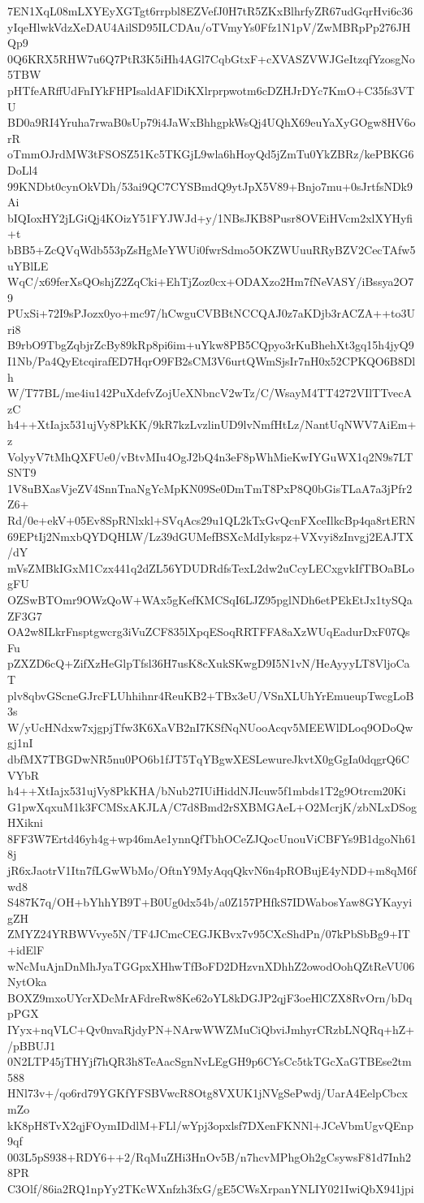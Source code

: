 7EN1XqL08mLXYEyXGTgt6rrpbl8EZVefJ0H7tR5ZKxBlhrfyZR67udGqrHvi6c36
yIqeHlwkVdzXeDAU4AilSD95ILCDAu/oTVmyYs0Ffz1N1pV/ZwMBRpPp276JHQp9
0Q6KRX5RHW7u6Q7PtR3K5iHh4AGl7CqbGtxF+cXVASZVWJGeItzqfYzosgNo5TBW
pHTfeARffUdFnIYkFHPIsaldAFlDiKXlrprpwotm6cDZHJrDYc7KmO+C35fs3VTU
BD0a9RI4Yruha7rwaB0sUp79i4JaWxBhhgpkWsQj4UQhX69euYaXyGOgw8HV6orR
oTmmOJrdMW3tFSOSZ51Kc5TKGjL9wla6hHoyQd5jZmTu0YkZBRz/kePBKG6DoLl4
99KNDbt0cynOkVDh/53ai9QC7CYSBmdQ9ytJpX5V89+Bnjo7mu+0sJrtfsNDk9Ai
bIQIoxHY2jLGiQj4KOizY51FYJWJd+y/1NBsJKB8Pusr8OVEiHVcm2xlXYHyfi+t
bBB5+ZcQVqWdb553pZsHgMeYWUi0fwrSdmo5OKZWUuuRRyBZV2CecTAfw5uYBlLE
WqC/x69ferXsQOshjZ2ZqCki+EhTjZoz0cx+ODAXzo2Hm7fNeVASY/iBssya2O79
PUxSi+72I9sPJozx0yo+mc97/hCwguCVBBtNCCQAJ0z7aKDjb3rACZA++to3Uri8
B9rbO9TbgZqbjrZcBy89kRp8pi6im+uYkw8PB5CQpyo3rKuBhehXt3gq15h4jyQ9
I1Nb/Pa4QyEtcqirafED7HqrO9FB2sCM3V6urtQWmSjsIr7nH0x52CPKQO6B8Dlh
W/T77BL/me4iu142PuXdefvZojUeXNbncV2wTz/C/WsayM4TT4272VIlTTvecAzC
h4++XtIajx531ujVy8PkKK/9kR7kzLvzlinUD9lvNmfHtLz/NantUqNWV7AiEm+z
VolyyV7tMhQXFUe0/vBtvMIu4OgJ2bQ4n3eF8pWhMieKwIYGuWX1q2N9s7LTSNT9
1V8uBXasVjeZV4SnnTnaNgYcMpKN09Se0DmTmT8PxP8Q0bGisTLaA7a3jPfr2Z6+
Rd/0e+ekV+05Ev8SpRNlxkl+SVqAcs29u1QL2kTxGvQcnFXceIlkcBp4qa8rtERN
69EPtIj2NmxbQYDQHLW/Lz39dGUMefBSXcMdIykspz+VXvyi8zInvgj2EAJTX/dY
mVsZMBkIGxM1Czx441q2dZL56YDUDRdfsTexL2dw2uCcyLECxgvkIfTBOaBLogFU
OZSwBTOmr9OWzQoW+WAx5gKefKMCSqI6LJZ95pglNDh6etPEkEtJx1tySQaZF3G7
OA2w8ILkrFnsptgwcrg3iVuZCF835lXpqESoqRRTFFA8aXzWUqEadurDxF07QsFu
pZXZD6cQ+ZifXzHeGlpTfsl36H7usK8cXukSKwgD9I5N1vN/HeAyyyLT8VljoCaT
plv8qbvGScneGJrcFLUhhihnr4ReuKB2+TBx3eU/VSnXLUhYrEmueupTwcgLoB3s
W/yUcHNdxw7xjgpjTfw3K6XaVB2nI7KSfNqNUooAcqv5MEEWlDLoq9ODoQwgj1nI
dbfMX7TBGDwNR5nu0PO6b1fJT5TqYBgwXESLewureJkvtX0gGgIa0dqgrQ6CVYbR
h4++XtIajx531ujVy8PkKHA/bNub27IUiHiddNJIcuw5f1mbds1T2g9Otrcm20Ki
G1pwXqxuM1k3FCMSxAKJLA/C7d8Bmd2rSXBMGAeL+O2McrjK/zbNLxDSogHXikni
8FF3W7Ertd46yh4g+wp46mAe1ynnQfTbhOCeZJQocUnouViCBFYs9B1dgoNh618j
jR6xJaotrV1Itn7fLGwWbMo/OftnY9MyAqqQkvN6n4pROBujE4yNDD+m8qM6fwd8
S487K7q/OH+bYhhYB9T+B0Ug0dx54b/a0Z157PHfkS7IDWabosYaw8GYKayyigZH
ZMYZ24YRBWVvye5N/TF4JCmcCEGJKBvx7v95CXcShdPn/07kPbSbBg9+IT+idElF
wNcMuAjnDnMhJyaTGGpxXHhwTfBoFD2DHzvnXDhhZ2owodOohQZtReVU06NytOka
BOXZ9mxoUYcrXDcMrAFdreRw8Ke62oYL8kDGJP2qjF3oeHlCZX8RvOrn/bDqpPGX
IYyx+nqVLC+Qv0nvaRjdyPN+NArwWWZMuCiQbviJmhyrCRzbLNQRq+hZ+/pBBUJ1
0N2LTP45jTHYjf7hQR3h8TeAacSgnNvLEgGH9p6CYsCc5tkTGcXaGTBEse2tm588
HNl73v+/qo6rd79YGKfYFSBVwcR8Otg8VXUK1jNVgSePwdj/UarA4EelpCbcxmZo
kK8pH8TvX2qjFOymIDdlM+FLl/wYpj3opxlsf7DXenFKNNl+JCeVbmUgvQEnp9qf
003L5pS938+RDY6++2/RqMuZHi3HnOv5B/n7hcvMPhgOh2gCsywsF81d7Inh28PR
C3Olf/86ia2RQ1npYy2TKcWXnfzh3fxG/gE5CWsXrpanYNLIY021IwiQbX941jpi
